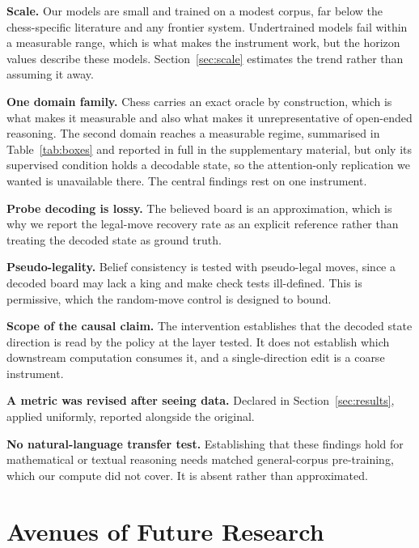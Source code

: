 \documentclass[11pt]{article}
\theoremstyle{remark}
\begin{document}
\begin{description}[nosep]
\item[L1] \textbf{Scale.} Our models are small and trained on a modest corpus,
far below the chess-specific literature and any frontier system. Undertrained
models fail within a measurable range, which is what makes the instrument work,
but the horizon values describe these models. Section~\ref{sec:scale} estimates
the trend rather than assuming it away.
\item[L2] \textbf{One domain family.} Chess carries an exact oracle by
construction, which is what makes it measurable and also what makes it
unrepresentative of open-ended reasoning. The second domain reaches a measurable regime,
summarised in Table~\ref{tab:boxes} and reported in full in the supplementary
material, but only its supervised condition holds a decodable state, so the
attention-only replication we wanted is unavailable there. The central findings
rest on one instrument.


\item[L3] \textbf{Probe decoding is lossy.} The believed board is an
approximation, which is why we report the legal-move recovery rate as an explicit
reference rather than treating the decoded state as ground truth.
\item[L4] \textbf{Pseudo-legality.} Belief consistency is tested with
pseudo-legal moves, since a decoded board may lack a king and make check tests
ill-defined. This is permissive, which the random-move control is designed to
bound.
\item[L5] \textbf{Scope of the causal claim.} The intervention establishes that
the decoded state direction is read by the policy at the layer tested. It does
not establish which downstream computation consumes it, and a single-direction
edit is a coarse instrument.
\item[L6] \textbf{A metric was revised after seeing data.} Declared in
Section~\ref{sec:results}, applied uniformly, reported alongside the original.
\item[L7] \textbf{No natural-language transfer test.} Establishing that these
findings hold for mathematical or textual reasoning needs matched general-corpus
pre-training, which our compute did not cover. It is absent rather than
approximated.
\end{description}

\section{Avenues of Future Research}
\end{document}
